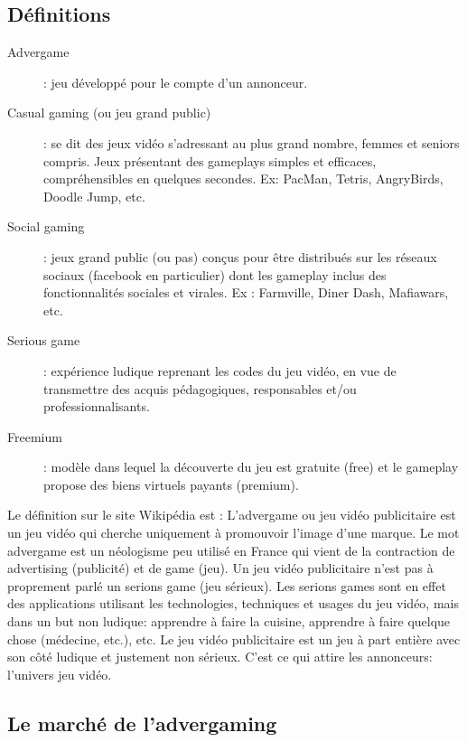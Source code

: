 \subsection{Définitions} %

\begin{description}  \item[Advergame] : jeu développé pour le compte d’un annonceur.

\item[Casual gaming (ou jeu grand public)] : se dit des jeux vidéo s'adressant au plus grand nombre, femmes et seniors compris. Jeux présentant des gameplays simples et efficaces, compréhensibles en quelques secondes. Ex: PacMan, Tetris, AngryBirds, Doodle Jump, etc.

\item[Social gaming] : jeux grand public (ou pas) conçus pour être distribués sur les réseaux sociaux (facebook en particulier) dont les gameplay inclus des fonctionnalités sociales et virales. Ex : Farmville, Diner Dash, Mafiawars, etc.

\item[Serious game] : expérience ludique reprenant les codes du jeu vidéo, en vue de transmettre des acquis pédagogiques, responsables et/ou professionnalisants.

\item[Freemium] : modèle dans lequel la découverte du jeu est gratuite (free) et le gameplay propose des biens virtuels payants (premium).
\end{description}
Le définition sur le site Wikipédia est : L'advergame ou jeu vidéo publicitaire est un jeu vidéo qui cherche uniquement à promouvoir l'image d'une marque. Le mot advergame est un néologisme peu utilisé en France qui vient de la contraction de advertising (publicité) et de game (jeu). Un jeu vidéo publicitaire n'est pas à proprement parlé un serions game (jeu sérieux). Les serions games sont en effet des applications utilisant les technologies, techniques et usages du jeu vidéo, mais dans un but non ludique: apprendre à faire la cuisine, apprendre à faire quelque chose (médecine, etc.), etc.
Le jeu vidéo publicitaire est un jeu à part entière avec son côté ludique et justement non sérieux. C'est ce qui attire les annonceurs: l'univers jeu vidéo.

\subsection{Le marché de l'advergaming} %

